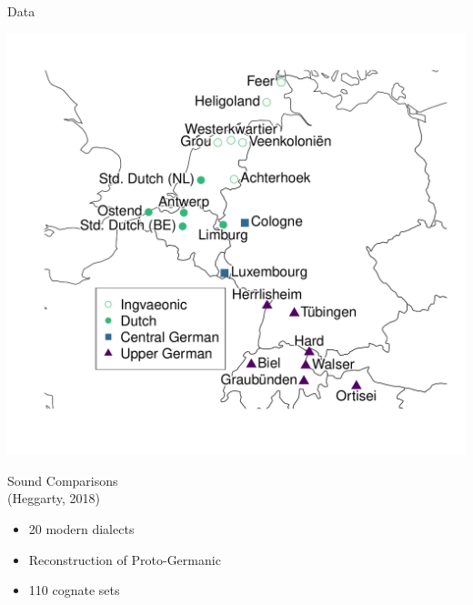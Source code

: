 \documentclass[xcolor={dvipsnames}]{beamer}
\begin{document}
\begin{frame}{Data}
\begin{minipage}{.6\textwidth}
\includegraphics[width=\textwidth,trim={4cm 0 5cm 0},clip]{figures/map-pres.pdf}
\end{minipage}%
\begin{minipage}{.4\textwidth}
Sound Comparisons\\(Heggarty, 2018)
\begin{itemize}
    \item 20 modern dialects
    \item Reconstruction of Proto-Germanic
    \item 110 cognate sets
\end{itemize}
\end{minipage}
\end{frame}
\end{document}
